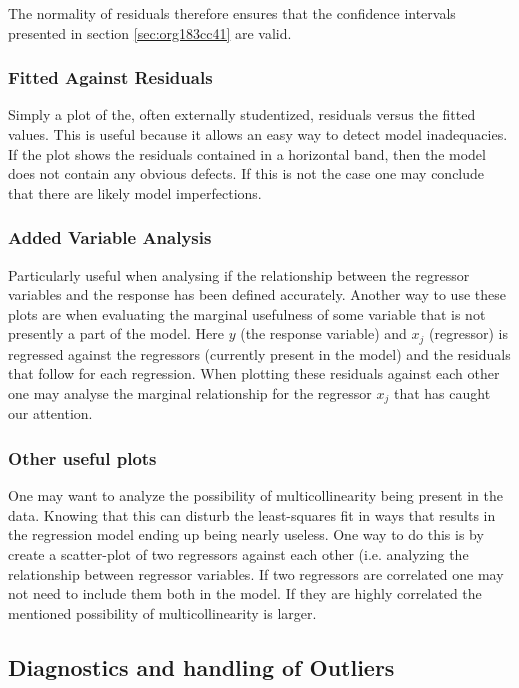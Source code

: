 \documentclass[11pt]{article}
\begin{document}
The normality of residuals therefore ensures that the confidence intervals presented in section \ref{sec:org183cc41}
are valid.

\subsubsection{Fitted Against Residuals}
\label{sec:orgd651abf}

Simply a plot of the, often externally studentized, residuals versus the fitted values. This is useful
because it allows an easy way to detect model inadequacies. If the plot shows the residuals contained in
a horizontal band, then the model does not contain any obvious defects. If this is not the case one may
conclude that there are likely model imperfections.
\subsubsection{Added Variable Analysis}
\label{sec:orge1f9c80}

Particularly useful when analysing if the relationship between the regressor variables and the response
has been defined accurately. Another way to use these plots are when evaluating the marginal usefulness
of some variable that is not presently a part of the model. Here \(y\) (the response variable) and \(x_j\)
(regressor) is regressed against the regressors (currently present in the model) and the residuals that
follow for each regression. When plotting these residuals against each other one may analyse the marginal
relationship for the regressor \(x_j\) that has caught our attention.

\subsubsection{Other useful plots}
\label{sec:org1451d7a}

One may want to analyze the possibility of multicollinearity being present in the data. Knowing that
this can disturb the least-squares fit in ways that results in the regression model ending up being
nearly useless. One way to do this is by create a scatter-plot of two regressors against each other
(i.e. analyzing the relationship between regressor variables. If two regressors are correlated one 
may not need to include them both in the model. If they are highly correlated the mentioned possibility 
of multicollinearity is larger. 

\subsection{Diagnostics and handling of Outliers}
\label{sec:org8cdc9de}
\end{document}
